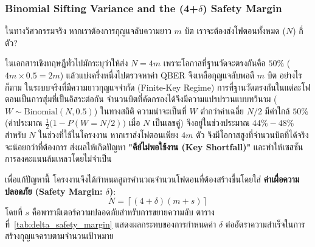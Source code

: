 \subsubsection{Binomial Sifting Variance and the (4+\texorpdfstring{$\delta$}{delta}) Safety Margin}
ในทางวิศวกรรมจริง หากเราต้องการกุญแจลับความยาว $m$ บิต เราจะต้องส่งโฟตอนทั้งหมด ($N$) กี่ตัว?

ในเอกสารเชิงทฤษฎีทั่วไปมักระบุว่าให้ส่ง $N = 4m$ เพราะโอกาสที่ฐานวัดจะตรงกันคือ $50\%$ ($4m \times 0.5 = 2m$) แล้วแบ่งครึ่งหนึ่งไปตรวจหาค่า QBER จึงเหลือกุญแจลับพอดี $m$ บิต อย่างไรก็ตาม ในระบบจริงที่มีความยาวกุญแจจำกัด (Finite-Key Regime) การที่ฐานวัดตรงกันในแต่ละโฟตอนเป็นการสุ่มที่เป็นอิสระต่อกัน จำนวนบิตที่คัดกรองได้จึงมีความแปรปรวนแบบทวินาม ($W \sim \text{Binomial}(N, 0.5)$) ในทางสถิติ ความน่าจะเป็นที่ $W$ ต่ำกว่าค่าเฉลี่ย $N/2$ มีค่าใกล้ $50\%$ (ค่าประมาณ $\tfrac{1}{2}\bigl(1 - P(W = N/2)\bigr)$ เมื่อ $N$ เป็นเลขคู่) จึงอยู่ในช่วงประมาณ $44\% - 48\%$ สำหรับ $N$ ในช่วงที่ใช้ในโครงงาน หากเราส่งโฟตอนเพียง $4m$ ตัว จึงมีโอกาสสูงที่จำนวนบิตที่ได้จริงจะน้อยกว่าที่ต้องการ ส่งผลให้เกิดปัญหา \textbf{"คีย์ไม่พอใช้งาน (Key Shortfall)"} และทำให้เซสชันการลงคะแนนล้มเหลวโดยไม่จำเป็น

เพื่อแก้ปัญหานี้ โครงงานจึงได้กำหนดสูตรคำนวณจำนวนโฟตอนที่ต้องสร้างขึ้นโดยใส่ \textbf{ค่าเผื่อความปลอดภัย (Safety Margin: $\delta$)}:
\begin{equation}
    N = \left\lceil (4 + \delta)(m + s) \right\rceil
\end{equation}
โดยที่ $s$ คือพารามิเตอร์ความปลอดภัยสำหรับการขยายความลับ
ตารางที่~\ref{tab:delta_safety_margin} แสดงผลกระทบของการกำหนดค่า $\delta$ ต่ออัตราความสำเร็จในการสร้างกุญแจครบตามจำนวนเป้าหมาย

